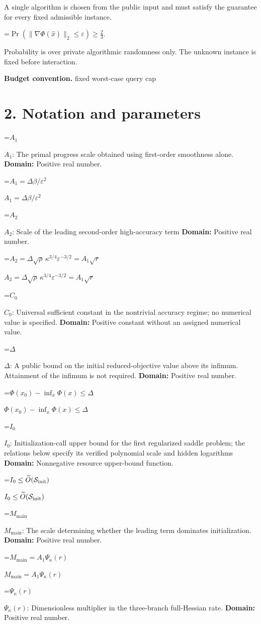 \documentclass[10pt,a4paper]{article}
\newcommand{\AtlasMath}[1]{\par\begingroup\centering\setbox0=\hbox{$\displaystyle #1$}\ifdim\wd0>1.4\linewidth\typeout{ATLAS WIDE FORMULA: \the\wd0}\fi\ifdim\wd0>\linewidth\resizebox{\linewidth}{!}{\box0}\else\box0\fi\par\endgroup}
\newcommand{\AtlasInlineMath}[1]{\begingroup\setbox0=\hbox{$#1$}\ifdim\wd0>.4\linewidth\endgroup\AtlasMath{#1}\else\endgroup$#1$\fi}
\begin{document}
A single algorithm is chosen from the public input and must satisfy the guarantee for every fixed admissible instance.


\AtlasMath{\Pr\!\left(\|\nabla\Phi(\widehat{x})\|_2\le\varepsilon\right)\ge\frac23.}


Probability is over private algorithmic randomness only. The unknown instance is fixed before interaction.

\textbf{Budget convention.} fixed worst-case query cap

\section{2. Notation and parameters}
\AtlasInlineMath{A_1}: The primal progress scale obtained using first-order smoothness alone. \textbf{Domain:} Positive real number.

\AtlasInlineMath{A_1=\Delta\beta/\varepsilon^2}

\AtlasInlineMath{A_2}: Scale of the leading second-order high-accuracy term \textbf{Domain:} Positive real number.

\AtlasInlineMath{A_2=\Delta\sqrt\rho\,\kappa^{3/4}\varepsilon^{-3/2}=A_1\sqrt r}

\AtlasInlineMath{C_0}: Universal sufficient constant in the nontrivial accuracy regime; no numerical value is specified. \textbf{Domain:} Positive constant without an assigned numerical value.

\AtlasInlineMath{\Delta}: A public bound on the initial reduced-objective value above its infimum. Attainment of the infimum is not required. \textbf{Domain:} Positive real number.

\AtlasInlineMath{\Phi(x_0)-\inf_x\Phi(x)\le\Delta}

\AtlasInlineMath{I_0}: Initialization-call upper bound for the first regularized saddle problem; the relations below specify its verified polynomial scale and hidden logarithms \textbf{Domain:} Nonnegative resource upper-bound function.

\AtlasInlineMath{I_0\le\widetilde O(\mathcal S_{\rm init})}

\AtlasInlineMath{M_{\mathrm{main}}}: The scale determining whether the leading term dominates initialization. \textbf{Domain:} Positive real number.

\AtlasInlineMath{M_{\mathrm{main}}=A_1\Psi_\kappa(r)}

\AtlasInlineMath{\Psi_\kappa(r)}: Dimensionless multiplier in the three-branch full-Hessian rate. \textbf{Domain:} Positive real number.
\end{document}
